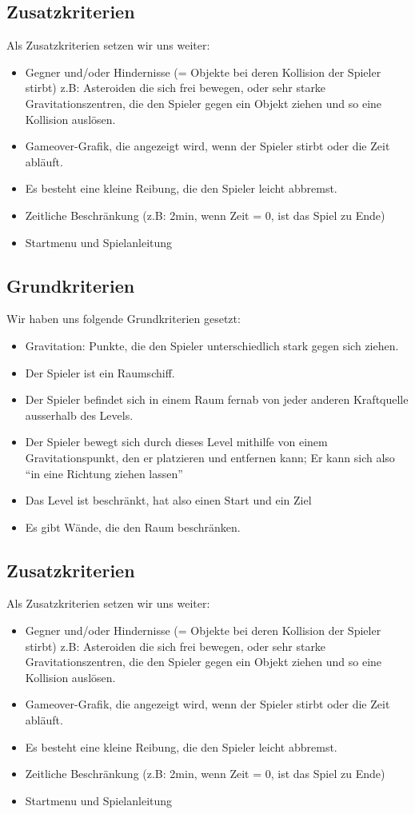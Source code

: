\documentclass[12pt,a4paper]{scrartcl}
\newcommand{\q}[1]{``#1''}
\begin{document}
\subsection{Zusatzkriterien}
Als Zusatzkriterien setzen wir uns weiter:
\begin{itemize}
\item Gegner und/oder Hindernisse (= Objekte bei deren Kollision der Spieler stirbt) z.B: Asteroiden die sich frei bewegen, oder sehr starke Gravitationszentren, die den Spieler gegen ein Objekt ziehen und so eine Kollision auslösen.
\item Gameover-Grafik, die angezeigt wird, wenn der Spieler stirbt oder die Zeit abläuft.
\item Es besteht eine kleine Reibung, die den Spieler leicht abbremst.
\item Zeitliche Beschränkung (z.B: 2min, wenn Zeit = 0, ist das Spiel zu Ende)
\item Startmenu und Spielanleitung
\end{itemize}

\subsection{Grundkriterien}
Wir haben uns folgende Grundkriterien gesetzt:
\begin{itemize}
\item Gravitation: Punkte, die den Spieler unterschiedlich stark gegen sich ziehen.
\item Der Spieler ist ein Raumschiff.
\item Der Spieler befindet sich in einem Raum fernab von jeder anderen Kraftquelle ausserhalb des Levels.
\item Der Spieler bewegt sich durch dieses Level mithilfe von  einem Gravitationspunkt, den er platzieren und entfernen kann; Er kann sich also \q{in eine Richtung ziehen lassen}
\item Das Level ist beschränkt, hat also einen Start und ein Ziel
\item Es gibt Wände, die den Raum beschränken.
\end{itemize}

\subsection{Zusatzkriterien}
Als Zusatzkriterien setzen wir uns weiter:
\begin{itemize}
\item Gegner und/oder Hindernisse (= Objekte bei deren Kollision der Spieler stirbt) z.B: Asteroiden die sich frei bewegen, oder sehr starke Gravitationszentren, die den Spieler gegen ein Objekt ziehen und so eine Kollision auslösen.
\item Gameover-Grafik, die angezeigt wird, wenn der Spieler stirbt oder die Zeit abläuft.
\item Es besteht eine kleine Reibung, die den Spieler leicht abbremst.
\item Zeitliche Beschränkung (z.B: 2min, wenn Zeit = 0, ist das Spiel zu Ende)
\item Startmenu und Spielanleitung
\end{itemize}
\end{document}
